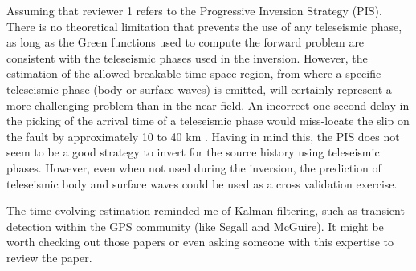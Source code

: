 \documentclass[10pt]{extarticle}
\begin{document}
%
\begin{Answer}
 Assuming that reviewer 1 refers to the Progressive Inversion Strategy (PIS). 
 There is no theoretical limitation that prevents the use of any teleseismic phase, 
 as long as the Green functions used to compute the forward problem are consistent 
 with the teleseismic phases used in the inversion. However, the estimation of 
 the allowed breakable time-space region, from where a specific teleseismic 
 phase (body or surface waves) is emitted, will certainly represent a more 
 challenging problem than in the near-field. An incorrect one-second delay 
 in the picking of the arrival time of a teleseismic phase would miss-locate the slip on 
 the fault by approximately 10 to 40 km \citep{Antolik_2001_GEL,Yang_2004_VRT}.
 Having in mind this, the PIS does not seem to be a good strategy to invert for the 
 source history using teleseismic phases.
 However, even when not used during the inversion, the prediction of teleseismic 
 body and surface waves could be used as a cross validation exercise.
 \WorkInProgressRevTask
\end{Answer}
%
%
\begin{ReviewerComment}{1}
\noindent 
 The time-evolving estimation reminded me of Kalman filtering, such as transient detection
 within the GPS community (like Segall and McGuire). It might be worth checking out
 those papers or even asking someone with this expertise to review the paper.
\end{ReviewerComment}
%
\end{document}
